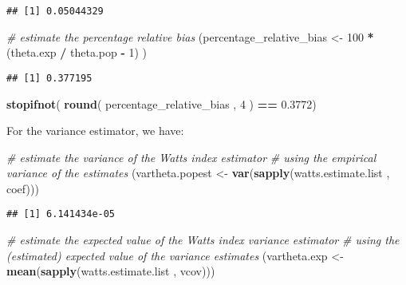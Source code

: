 \documentclass[
]{book}
\newenvironment{Shaded}{\begin{snugshade}}{\end{snugshade}}
\newcommand{\CommentTok}[1]{\textcolor[rgb]{0.56,0.35,0.01}{\textit{#1}}}
\newcommand{\DecValTok}[1]{\textcolor[rgb]{0.00,0.00,0.81}{#1}}
\newcommand{\FloatTok}[1]{\textcolor[rgb]{0.00,0.00,0.81}{#1}}
\newcommand{\FunctionTok}[1]{\textcolor[rgb]{0.13,0.29,0.53}{\textbf{#1}}}
\newcommand{\NormalTok}[1]{#1}
\newcommand{\OtherTok}[1]{\textcolor[rgb]{0.56,0.35,0.01}{#1}}
\newcommand{\SpecialCharTok}[1]{\textcolor[rgb]{0.81,0.36,0.00}{\textbf{#1}}}
\begin{document}
\begin{verbatim}
## [1] 0.05044329
\end{verbatim}

\begin{Shaded}
\begin{Highlighting}[]
\CommentTok{\# estimate the percentage relative bias}
\NormalTok{(percentage\_relative\_bias }\OtherTok{\textless{}{-}} \DecValTok{100} \SpecialCharTok{*}\NormalTok{ (theta.exp }\SpecialCharTok{/}\NormalTok{ theta.pop }\SpecialCharTok{{-}} \DecValTok{1}\NormalTok{) )}
\end{Highlighting}
\end{Shaded}

\begin{verbatim}
## [1] 0.377195
\end{verbatim}

\begin{Shaded}
\begin{Highlighting}[]
\FunctionTok{stopifnot}\NormalTok{( }\FunctionTok{round}\NormalTok{( percentage\_relative\_bias , }\DecValTok{4}\NormalTok{ ) }\SpecialCharTok{==} \FloatTok{0.3772}\NormalTok{)}
\end{Highlighting}
\end{Shaded}

For the variance estimator, we have:

\begin{Shaded}
\begin{Highlighting}[]
\CommentTok{\# estimate the variance of the Watts index estimator}
\CommentTok{\# using the empirical variance of the estimates}
\NormalTok{(vartheta.popest }\OtherTok{\textless{}{-}} \FunctionTok{var}\NormalTok{(}\FunctionTok{sapply}\NormalTok{(watts.estimate.list , coef)))}
\end{Highlighting}
\end{Shaded}

\begin{verbatim}
## [1] 6.141434e-05
\end{verbatim}

\begin{Shaded}
\begin{Highlighting}[]
\CommentTok{\# estimate the expected value of the Watts index variance estimator}
\CommentTok{\# using the (estimated) expected value of the variance estimates}
\NormalTok{(vartheta.exp }\OtherTok{\textless{}{-}} \FunctionTok{mean}\NormalTok{(}\FunctionTok{sapply}\NormalTok{(watts.estimate.list , vcov)))}
\end{Highlighting}
\end{Shaded}
\end{document}
